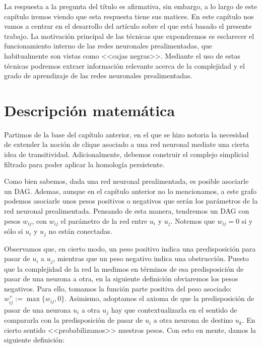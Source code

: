 \documentclass[12pt, a4paper, twoside]{book}
\numberwithin{equation}{section}
\theoremstyle{definition}
\theoremstyle{remark}
\theoremstyle{plain}
\begin{document}
	La respuesta a la pregunta del título es afirmativa, sin embargo, a lo 
	largo de este capítulo iremos viendo que esta respuesta tiene sus 
	matices. En este capítulo nos vamos a centrar en el desarrollo del 
	artículo \cite{Articulo-Watanabe} sobre el que está basado el presente 
	trabajo. 
	La motivación principal de las técnicas que expondremos es esclarecer
	el funcionamiento interno de las redes neuronales prealimentadas, que 
	habitualmente son vistas como <<cajas negras>>. Mediante el uso de 
	estas técnicas podremos extraer información relevante acerca de la 
	complejidad y el grado de aprendizaje de las redes neuronales 
	prealimentadas. 

	\section{Descripción matemática}
	
	Partimos de la base del capítulo anterior, en el que se hizo notoria 
	la necesidad de extender la noción de clique asociado a una red 
	neuronal mediate una cierta idea de transitividad. Adicionalmente, 
	debemos construir el complejo simplicial filtrado para poder aplicar 
	la homología persistente.
	
	Como bien sabemos, dada una red neuronal prealimentada, es posible 
	asociarle un DAG. Ademas, aunque en el capítulo anterior no lo 
	mencionamos, a este grafo podemos asociarle unos pesos positivos o 
	negativos que serán los 
	parámetros de la red neuronal prealimentada. Pensando de esta manera, 
	tendremos un DAG con pesos $w_{ij}$, con $w_{ij}$ el parámetro de la 
	red entre $u_{i}$ y $u_{j}$. Notemos que $w_{ij}=0$ si y sólo si 
	$u_{i}$ y $u_{j}$ no están conectadas.
	
	Observamos que, en cierto modo, un peso positivo indica una 
	predisposición para pasar de $u_{i}$ a $u_{j}$, mientras que un peso 
	negativo indica una obstrucción. Puesto que la complejidad de la red 
	la medimos en términos de esa predisposición de pasar de una neurona a 
	otra, en la siguiente definición obviaremos los pesos negativos. Para 
	ello, tomamos la función parte positiva del peso asociado: 
	$w_{ij}^{+}:=\max\{w_{ij},0\}$. Asimismo, adoptamos el axioma de que 
	la predisposición de pasar de una neurona $u_{i}$ a otra $u_{j}$ hay 
	que contextualizarla en el sentido de compararla con la predisposición
	de pasar de $u_{i}$ a otra neurona de destino $u_{k}$. En cierto 
	sentido <<probabilizamos>> nuestros pesos. Con esto en mente, damos la 
	siguiente definición: 
	
\end{document}
